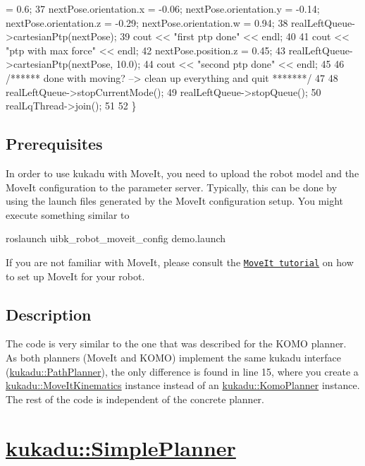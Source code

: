 \begin{DoxyCodeInclude}
       = 0.6;
37     nextPose.orientation.x = -0.06; nextPose.orientation.y = -0.14; nextPose.orientation.z = -0.29; 
      nextPose.orientation.w = 0.94;
38     realLeftQueue->cartesianPtp(nextPose);
39     cout << \textcolor{stringliteral}{"first ptp done"} << endl;
40 
41     cout << \textcolor{stringliteral}{"ptp with max force"} << endl;
42     nextPose.position.z = 0.45;
43     realLeftQueue->cartesianPtp(nextPose, 10.0);
44     cout << \textcolor{stringliteral}{"second ptp done"} << endl;
45 
46     \textcolor{comment}{/****** done with moving? --> clean up everything and quit *******/}
47 
48     realLeftQueue->stopCurrentMode();
49     realLeftQueue->stopQueue();
50     realLqThread->join();
51 
52 \}
\end{DoxyCodeInclude}


\subsection*{Prerequisites}

In order to use kukadu with Move\-It, you need to upload the robot model and the Move\-It configuration to the parameter server. Typically, this can be done by using the launch files generated by the Move\-It configuration setup. You might execute something similar to 
\begin{DoxyCode}
roslaunch uibk\_robot\_moveit\_config demo.launch
\end{DoxyCode}
 If you are not familiar with Move\-It, please consult the \href{http://moveit.ros.org/documentation/tutorials/}{\tt Move\-It tutorial} on how to set up Move\-It for your robot.

\subsection*{Description}

The code is very similar to the one that was described for the K\-O\-M\-O planner. As both planners (Move\-It and K\-O\-M\-O) implement the same kukadu interface (\hyperlink{classkukadu_1_1PathPlanner}{kukadu\-::\-Path\-Planner}), the only difference is found in line 15, where you create a \hyperlink{classkukadu_1_1MoveItKinematics}{kukadu\-::\-Move\-It\-Kinematics} instance instead of an \hyperlink{classkukadu_1_1KomoPlanner}{kukadu\-::\-Komo\-Planner} instance. The rest of the code is independent of the concrete planner.

\section*{\hyperlink{classkukadu_1_1SimplePlanner}{kukadu\-::\-Simple\-Planner}}

